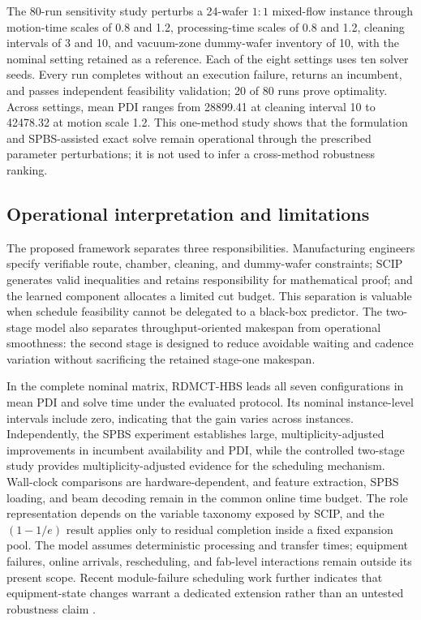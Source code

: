 \documentclass[preprint,12pt,authoryear]{elsarticle}
\newcommand{\method}{RDMCT-HBS}
\begin{document}
The 80-run sensitivity study perturbs a 24-wafer $1{:}1$ mixed-flow instance
through motion-time scales of 0.8 and 1.2, processing-time scales of 0.8 and
1.2, cleaning intervals of 3 and 10, and vacuum-zone dummy-wafer inventory of
10, with the nominal setting retained as a reference. Each of the eight
settings uses ten solver seeds. Every run completes without an execution
failure, returns an incumbent, and passes independent feasibility validation;
20 of 80 runs prove optimality. Across settings, mean PDI ranges from 28899.41
at cleaning interval 10 to 42478.32 at motion scale 1.2. This one-method study
shows that the formulation and SPBS-assisted exact solve remain operational
through the prescribed parameter perturbations; it is not used to infer a
cross-method robustness ranking.

\subsection{Operational interpretation and limitations}

The proposed framework separates three responsibilities. Manufacturing
engineers specify verifiable route, chamber, cleaning, and dummy-wafer constraints;
SCIP generates valid inequalities and retains responsibility for mathematical
proof; and the learned component allocates a limited cut budget. This
separation is valuable when schedule feasibility cannot be delegated to a
black-box predictor. The two-stage model also separates throughput-oriented
makespan from operational smoothness: the second stage is designed to reduce
avoidable waiting and cadence variation without sacrificing the retained
stage-one makespan.

In the complete nominal matrix, \method{} leads all seven configurations in
mean PDI and solve time under the evaluated protocol. Its nominal
instance-level intervals include zero, indicating that the gain varies across
instances. Independently, the SPBS experiment establishes large,
multiplicity-adjusted improvements in incumbent availability and PDI, while
the controlled two-stage study provides multiplicity-adjusted evidence for
the scheduling mechanism.
Wall-clock comparisons are hardware-dependent, and feature extraction, SPBS
loading, and beam decoding remain in the common online time budget. The role
representation depends on the variable
taxonomy exposed by SCIP, and the $(1-1/e)$ result applies only to residual
completion inside a fixed expansion pool. The model assumes deterministic
processing and transfer times; equipment failures, online arrivals,
rescheduling, and fab-level interactions remain outside its present scope.
Recent module-failure scheduling work further indicates that equipment-state
changes warrant a dedicated extension rather than an untested robustness
claim \citep{zhu2026modulefailure}.
\end{document}
